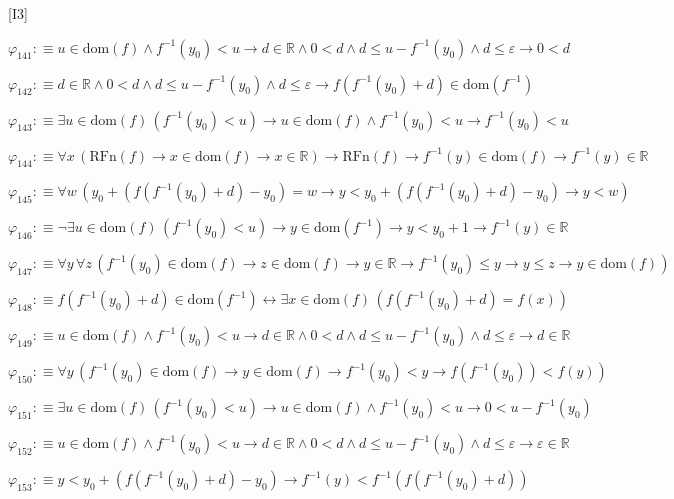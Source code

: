 \begin{fullproof}{[I3]}
\begin{abbrevlist}
\item $\varphi_{141} :\equiv u \in \mathrm{dom}(f) \land f^{-1}(y_{0}) < u \to d \in \mathbb{R} \land 0 < d \land d \leq u - f^{-1}(y_{0}) \land d \leq \varepsilon \to 0 < d$
\item $\varphi_{142} :\equiv d \in \mathbb{R} \land 0 < d \land d \leq u - f^{-1}(y_{0}) \land d \leq \varepsilon \to f(f^{-1}(y_{0}) + d) \in \mathrm{dom}(f^{-1})$
\item $\varphi_{143} :\equiv \exists u \in \mathrm{dom}(f)\,(f^{-1}(y_{0}) < u) \to u \in \mathrm{dom}(f) \land f^{-1}(y_{0}) < u \to f^{-1}(y_{0}) < u$
\item $\varphi_{144} :\equiv \forall x\,(\mathrm{RFn}(f) \to x \in \mathrm{dom}(f) \to x \in \mathbb{R}) \to \mathrm{RFn}(f) \to f^{-1}(y) \in \mathrm{dom}(f) \to f^{-1}(y) \in \mathbb{R}$
\item $\varphi_{145} :\equiv \forall w\,(y_{0} + (f(f^{-1}(y_{0}) + d) - y_{0}) = w \to y < y_{0} + (f(f^{-1}(y_{0}) + d) - y_{0}) \to y < w)$
\item $\varphi_{146} :\equiv \neg \exists u \in \mathrm{dom}(f)\,(f^{-1}(y_{0}) < u) \to y \in \mathrm{dom}(f^{-1}) \to y < y_{0} + 1 \to f^{-1}(y) \in \mathbb{R}$
\item $\varphi_{147} :\equiv \forall y\,\forall z\,(f^{-1}(y_{0}) \in \mathrm{dom}(f) \to z \in \mathrm{dom}(f) \to y \in \mathbb{R} \to f^{-1}(y_{0}) \leq y \to y \leq z \to y \in \mathrm{dom}(f))$
\item $\varphi_{148} :\equiv f(f^{-1}(y_{0}) + d) \in \mathrm{dom}(f^{-1}) \leftrightarrow \exists x \in \mathrm{dom}(f)\,(f(f^{-1}(y_{0}) + d) = f(x))$
\item $\varphi_{149} :\equiv u \in \mathrm{dom}(f) \land f^{-1}(y_{0}) < u \to d \in \mathbb{R} \land 0 < d \land d \leq u - f^{-1}(y_{0}) \land d \leq \varepsilon \to d \in \mathbb{R}$
\item $\varphi_{150} :\equiv \forall y\,(f^{-1}(y_{0}) \in \mathrm{dom}(f) \to y \in \mathrm{dom}(f) \to f^{-1}(y_{0}) < y \to f(f^{-1}(y_{0})) < f(y))$
\item $\varphi_{151} :\equiv \exists u \in \mathrm{dom}(f)\,(f^{-1}(y_{0}) < u) \to u \in \mathrm{dom}(f) \land f^{-1}(y_{0}) < u \to 0 < u - f^{-1}(y_{0})$
\item $\varphi_{152} :\equiv u \in \mathrm{dom}(f) \land f^{-1}(y_{0}) < u \to d \in \mathbb{R} \land 0 < d \land d \leq u - f^{-1}(y_{0}) \land d \leq \varepsilon \to \varepsilon \in \mathbb{R}$
\item $\varphi_{153} :\equiv y < y_{0} + (f(f^{-1}(y_{0}) + d) - y_{0}) \to f^{-1}(y) < f^{-1}(f(f^{-1}(y_{0}) + d))$

\end{abbrevlist}
\end{fullproof}
